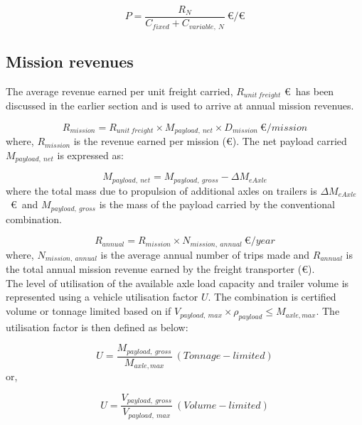 \documentclass[ExampleMasters.tex]{subfiles}
\begin{document}
		\begin{equation} \label{eq:productivity}
			P = \frac{R_N}{C_{fixed} + C_{variable,\ N}}\ \euro/\euro
		\end{equation}

		\subsection{Mission revenues}

		The average revenue earned per unit freight carried, $R_{unit\ freight}$ \euro \ has been discussed in the earlier section and is used to arrive at annual mission revenues.

		\begin{equation}
			R_{mission} = R_{unit\ freight} \times M_{payload,\ net} \times D_{mission} \  \euro / mission
		\end{equation}
		where, $R_{mission}$ is the revenue earned per mission (\euro). The net payload carried $M_{payload,\ net}$ is expressed as:

		\begin{equation}
			M_{payload,\ net} = M_{payload,\ gross} - \Delta M_{eAxle}
		\end{equation}
		where the total mass due to propulsion of additional axles on trailers is $\Delta M_{eAxle}$ \ \euro \ and $M_{payload,\ gross}$ is the mass of the payload carried by the conventional combination. 

		\begin{equation}
			R_{annual} = R_{mission} \times N_{mission,\ annual} \  \euro / year
		\end{equation}
		where, $N_{mission,\ annual}$ is the average annual number of trips made and $R_{annual}$ is the total annual mission revenue earned by the freight transporter (\euro). \\

		The level of utilisation of the available axle load capacity and trailer volume is represented using a vehicle utilisation factor $U$. The combination is certified volume or tonnage limited based on if $V_{payload,\ max} \times \rho_{payload} \leq M_{axle, max}$. The utilisation factor is then defined as below:

		\begin{equation}
			U = \frac{M_{payload,\ gross}}{M_{axle,max}}\ (Tonnage-limited)
		\end{equation}
		or,

		\begin{equation}
			U = \frac{V_{payload,\ gross}}{V_{payload,\ max}}\ (Volume-limited)
		\end{equation}
\end{document}
